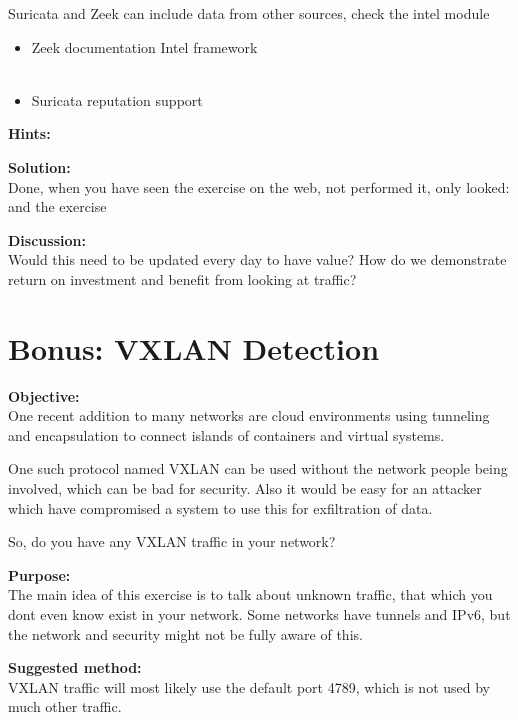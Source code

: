 \documentclass[a4paper,11pt,notitlepage]{report}
\begin{document}
Suricata and Zeek can include data from other sources, check the intel module\\

\begin{itemize}
\item Zeek documentation Intel framework\\
\\
\item Suricata reputation support\\
\end{itemize}

{\bf Hints:}


{\bf Solution:}\\
Done, when you have seen the exercise on the web, not performed it, only looked:
and the exercise 

{\bf Discussion:}\\

Would this need to be updated every day to have value? How do we demonstrate return on investment and benefit from looking at traffic?


\chapter{Bonus: VXLAN Detection}
\label{ex:vxlandetect}


{\bf Objective:} \\
One recent addition to many networks are cloud environments using tunneling and encapsulation to connect islands of containers and virtual systems.

One such protocol named VXLAN can be used without the network people being involved, which can be bad for security. Also it would be easy for an attacker which have compromised a system to use this for exfiltration of data.

So, do you have any VXLAN traffic in your network?


{\bf Purpose:}\\
The main idea of this exercise is to talk about unknown traffic, that which you dont even know exist in your network. Some networks have tunnels and IPv6, but the network and security might not be fully aware of this.


{\bf Suggested method:}\\
VXLAN traffic will most likely use the default port 4789, which is not used by much other traffic.
\end{document}
